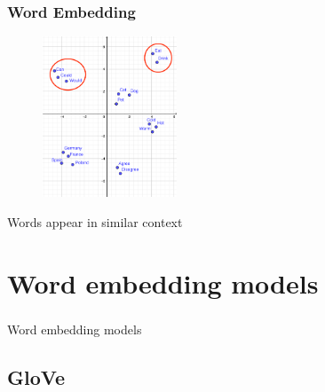 

\begin{frame}
	\frametitle{Word Embedding}

	\begin{figure}
		\includegraphics[width=4cm]{./figures/Group_context}
	\end{figure}
		\begin{center}
		{Words appear in similar context}
		\end{center}
	\vspace{-0.5cm}

\end{frame}


\section{Word embedding models}


\begin{frame}
\frametitle{}

\begin{center}
	\Huge {Word embedding models}
\end{center}
\end{frame}


\subsection{GloVe}

